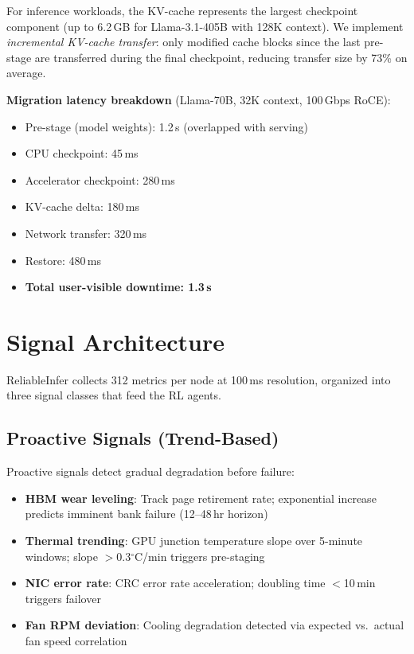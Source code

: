 \documentclass[conference,10pt,letterpaper]{IEEEtran}
\begin{document}
For inference workloads, the KV-cache represents the largest checkpoint component (up to 6.2\,GB for Llama-3.1-405B with 128K context). We implement \emph{incremental KV-cache transfer}: only modified cache blocks since the last pre-stage are transferred during the final checkpoint, reducing transfer size by 73\% on average.

\textbf{Migration latency breakdown} (Llama-70B, 32K context, 100\,Gbps RoCE):
\begin{itemize}
\item Pre-stage (model weights): 1.2\,s (overlapped with serving)
\item CPU checkpoint: 45\,ms
\item Accelerator checkpoint: 280\,ms
\item KV-cache delta: 180\,ms
\item Network transfer: 320\,ms
\item Restore: 480\,ms
\item \textbf{Total user-visible downtime: 1.3\,s}
\end{itemize}

\section{Signal Architecture}
\label{sec:signals}

ReliableInfer collects 312 metrics per node at 100\,ms resolution, organized into three signal classes that feed the RL agents.

\subsection{Proactive Signals (Trend-Based)}

Proactive signals detect gradual degradation before failure:
\begin{itemize}
\item \textbf{HBM wear leveling}: Track page retirement rate; exponential increase predicts imminent bank failure (12--48\,hr horizon)
\item \textbf{Thermal trending}: GPU junction temperature slope over 5-minute windows; slope $>$0.3$^\circ$C/min triggers pre-staging
\item \textbf{NIC error rate}: CRC error rate acceleration; doubling time $<$10\,min triggers failover
\item \textbf{Fan RPM deviation}: Cooling degradation detected via expected vs.\ actual fan speed correlation
\end{itemize}
\end{document}
